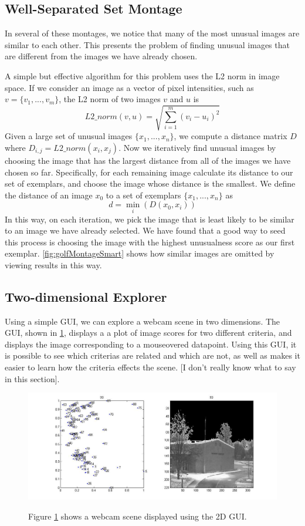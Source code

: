 \subsection{Well-Separated Set Montage}

In several of these montages, we notice that many of the most unusual images are similar to each other.  This presents the problem of finding unusual images that are different from the images we have already chosen.

A simple but effective algorithm for this problem uses the L2 norm in image space.  If we consider an image as a vector of pixel intensities, such as $v = \{v_1, ..., v_m\}$, the L2 norm of two images $v$ and $u$ is $$L2\_norm(v,u) = \sqrt{\sum_{i=1}^m{(v_i-u_i)^2}}$$  Given a large set of unusual images $\{x_1, ..., x_n\}$, we compute a distance matrix $D$ where $D_{i,j} = L2\_norm(x_i, x_j).$  Now we iteratively find unusual images by choosing the image that has the largest distance from all of the images we have chosen so far.  Specifically, for each remaining image calculate its distance to our set of exemplars, and choose the image whose distance is the smallest.  We define the distance of an image $x_0$ to a set of exemplars $\{x_1, ..., x_n\}$ as $$d = \min_i(D(x_0, x_i))$$In this way, on each iteration, we pick the image that is least likely to be similar to an image we have already selected.  We have found that a good way to seed this process is choosing the image with the highest unusualness score as our first exemplar.  \ref{fig:golfMontageSmart} shows how similar images are omitted by viewing results in this way.

\subsection{Two-dimensional Explorer}


Using a simple GUI, we can explore a webcam scene in two dimensions.  The GUI, shown in \ref{fig:2dGui}, displays a a plot of image scores for two different criteria, and displays the image corresponding to a mouseovered datapoint.  Using this GUI, it is possible to see which criterias are related and which are not, as well as makes it easier to learn how the criteria effects the scene. [I don't really know what to say in this section].

\begin{figure}[ht]
	\centering
		\includegraphics[width=1\textwidth]{figures/2dGui.jpg}
	\label{fig:2dGui}
	
		\caption[Exploring 2D image space using a simple GUI.]{Figure \ref{fig:2dGui} shows a webcam scene displayed using the 2D GUI.}
\end{figure}


